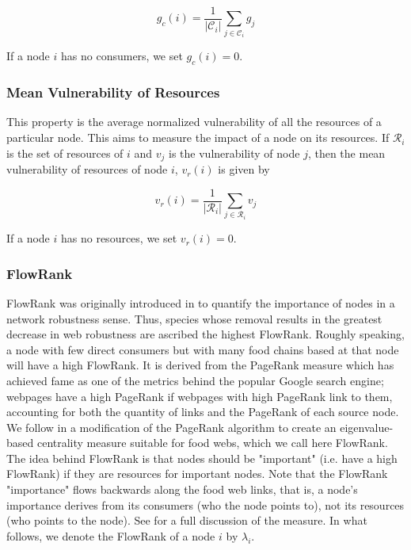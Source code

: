 \documentclass[/home/nkappler/Research/Dissertation/dissertation.tex]{subfiles}
\begin{document}
\begin{bibunit}
\begin{equation} 
    g_c(i) = \frac{1}{|\mathcal{C}_i|}\sum_{j\in\mathcal{C}_i}g_j
\label{eq:MeanGeneralityConsumers} 
\end{equation}

If a node $i$ has no consumers, we set $g_c(i)=0$. 


\subsubsection{Mean Vulnerability of Resources} This property is the average
normalized vulnerability of all the resources of a particular node. This aims
to measure the impact of a node on its resources. If $\mathcal{R}_i$ is the
set of resources of $i$ and $v_j$ is the vulnerability of node $j$, then the
mean vulnerability of resources of node $i$, $v_r(i)$ is given by

\begin{equation} 
    v_r(i) = \frac{1}{|\mathcal{R}_i|}\sum_{j\in\mathcal{R}_i}v_j
\label{eq:MeanVulnerabilityResources}  
\end{equation}

If a node $i$ has no resources, we set $v_r(i)=0$.

\newcommand\FR{\mathit{FR}} 

\subsubsection{FlowRank} FlowRank was originally introduced in
\cite*{Allesina2009b} to quantify the importance of nodes in a network
robustness sense. Thus, species whose removal results in the greatest decrease
in web robustness are ascribed the highest FlowRank. Roughly speaking, a node
with few direct consumers but with many food chains based at that node will
have a high FlowRank.  It is derived from the PageRank measure which has
achieved fame as one of the metrics behind the popular Google search engine;
webpages have a high PageRank if webpages with high PageRank link to them,
accounting for both the quantity of links and the PageRank of each source node.
We follow \cite*{Allesina2009b} in a modification of the PageRank algorithm to
create an eigenvalue-based centrality measure suitable for food webs, which we
call here FlowRank. The idea behind FlowRank is that nodes should be
"important" (i.e. have a high FlowRank) if they are resources for important
nodes. Note that the FlowRank "importance" flows backwards along the food web
links, that is, a node's importance derives from its consumers (who the node
points to), not its resources (who points to the node). See
\cite*{Allesina2009b} for a full discussion of the measure. In what follows, we
denote the FlowRank of a node $i$ by $\lambda_i$.


\end{bibunit}
\end{document}
